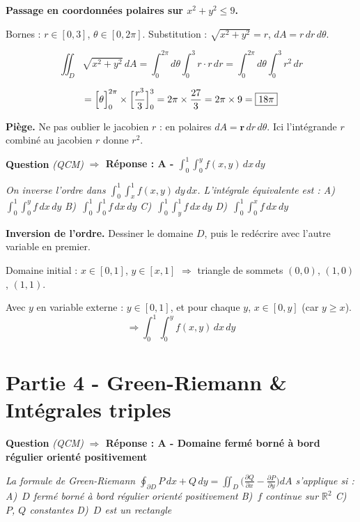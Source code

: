 \documentclass[11pt,a4paper]{article}
\newcounter{qnum}
\newcommand{\qtitre}[2]{%
  \stepcounter{qnum}%
  \medskip\noindent
  \textbf{\color{bleutexte}Question \theqnum}\enspace
  \textit{(#1)}\enspace
  \textcolor{vertok}{\textbf{$\Rightarrow$ Réponse : #2}}
  \par\smallskip
}
\newcommand{\qenonce}[1]{%
  \begin{mdframed}[backgroundcolor=grisbox, linewidth=0pt,
    innerleftmargin=8pt, innerrightmargin=8pt,
    innertopmargin=5pt, innerbottommargin=5pt,
    skipabove=2pt, skipbelow=4pt]
  \small\textit{#1}
  \end{mdframed}
}
\begin{document}
\begin{reponsebox}
\textbf{Passage en coordonnées polaires sur $x^2+y^2\leq 9$.}

Bornes : $r \in [0,3]$, $\theta \in [0,2\pi]$. Substitution : $\sqrt{x^2+y^2} = r$, $dA = r\,dr\,d\theta$.

$$\iint_D\sqrt{x^2+y^2}\,dA = \int_0^{2\pi}\!\!d\theta\int_0^3 r\cdot r\,dr = \int_0^{2\pi}\!\!d\theta\int_0^3 r^2\,dr$$

$$= \Bigl[\theta\Bigr]_0^{2\pi}\times\Bigl[\frac{r^3}{3}\Bigr]_0^3 = 2\pi \times \frac{27}{3} = 2\pi \times 9 = \boxed{18\pi}$$
\end{reponsebox}

\begin{piegebox}
\textbf{Piège.} Ne pas oublier le jacobien $r$ : en polaires $dA = \mathbf{r}\,dr\,d\theta$. Ici l'intégrande $r$ combiné au jacobien $r$ donne $r^2$.
\end{piegebox}

\qtitre{QCM}{A - $\int_0^1\int_0^y f(x,y)\,dx\,dy$}
\qenonce{On inverse l'ordre dans $\int_0^1\int_x^1 f(x,y)\,dy\,dx$. L'intégrale équivalente est :
\quad A)~$\int_0^1\int_0^y f\,dx\,dy$ \quad B)~$\int_0^1\int_0^1 f\,dx\,dy$ \quad C)~$\int_0^1\int_y^1 f\,dx\,dy$ \quad D)~$\int_0^1\int_0^x f\,dx\,dy$}

\begin{methodebox}
\textbf{Inversion de l'ordre.} Dessiner le domaine $D$, puis le redécrire avec l'autre variable en premier.
\end{methodebox}

Domaine initial : $x \in [0,1]$, $y \in [x,1]$ $\Rightarrow$ triangle de sommets $(0,0)$, $(1,0)$, $(1,1)$.

Avec $y$ en variable externe : $y \in [0,1]$, et pour chaque $y$, $x \in [0, y]$ (car $y \geq x$).
$$\Rightarrow\int_0^1\!\int_0^y f(x,y)\,dx\,dy$$

\section{Partie 4 - Green-Riemann \& Intégrales triples}

\qtitre{QCM}{A - Domaine fermé borné à bord régulier orienté positivement}
\qenonce{La formule de Green-Riemann $\oint_{\partial D} P\,dx+Q\,dy = \iint_D\!\bigl(\frac{\partial Q}{\partial x}-\frac{\partial P}{\partial y}\bigr)dA$ s'applique si :
\quad A)~$D$ fermé borné à bord régulier orienté positivement \quad B)~$f$ continue sur $\mathbb{R}^2$ \quad C)~$P$, $Q$ constantes \quad D)~$D$ est un rectangle}
\end{document}
